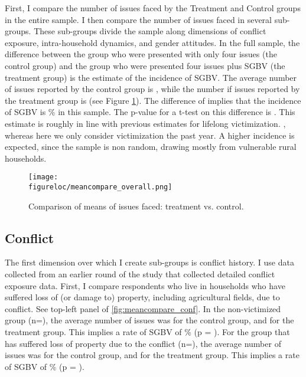 \documentclass[10pt,a4paper]{scrartcl} %
\newcommand{\figureloc}{C:/Users/Koen/Dropbox/PhD/Papers/CongoGBV/Figures}
\begin{document}
First, I compare the number of issues faced by the Treatment and Control groups in the entire sample. I then compare the number of issues faced in several sub-groups. These sub-groups divide the sample along dimensions of conflict exposure, intra-household dynamics, and gender attitudes. In the full sample, the difference between the group who were presented with only four issues (the control group) and the group who were presented four issues plus SGBV (the treatment group) is the estimate of the incidence of SGBV. The average number of issues reported by the control group is , while the number if issues reported by the treatment group is  (see Figure \ref{fig:meancompare_overall}). The difference of  implies that the incidence of SGBV is \% in this sample. The p-value for a t-test on this difference is . This estimate is roughly in line with previous estimates for lifelong victimization.
 \citep{Peterson2018,Stark2017,Johnson2010}, whereas here we only consider victimization the past year. A higher incidence is expected, since the sample is non random, drawing mostly from vulnerable rural households. 


\begin{figure}[htb]
  \texttt{[image: \\figureloc/meancompare\_overall.png]}
  \caption{Comparison of means of issues faced: treatment vs. control.}
  \label{fig:meancompare_overall}
\end{figure}

\subsection*{Conflict}
The first dimension over which I create sub-groups is conflict history. I use data collected from an earlier round of the study that collected detailed conflict exposure data. First, I compare respondents who live in households who have suffered loss of (or damage to) property, including agricultural fields, due to conflict. See top-left panel of \ref{fig:meancompare_conf}. In the non-victimized group (n=), the average number of issues was  for the control group, and  for the treatment group. This implies a rate of SGBV of \% (p = ). For the group that has suffered loss of property due to the conflict (n=), the average number of issues was  for the control group, and  for the treatment group. This implies a rate of SGBV of \% (p = ).
\end{document}
